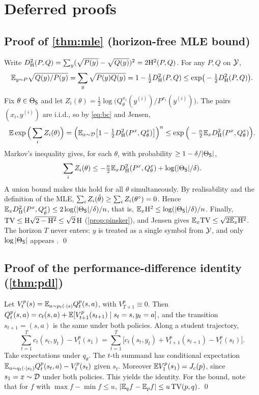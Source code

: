 \section{Deferred proofs}\label{app:proofs}

\subsection{Proof of \cref{thm:mle} (horizon-free MLE bound)}\label{app:mle}

Write $D_{\mathrm{H}}^2(P,Q)=\sum_y(\sqrt{P(y)}-\sqrt{Q(y)})^2=2\mathrm{H}^2(P,Q)$. For any $P,Q$ on $\mathcal{Y}$,
\begin{equation}\label{eq:bc}
\mathbb{E}_{y\sim P}\sqrt{Q(y)/P(y)}=\sum_y\sqrt{P(y)Q(y)}=1-\tfrac12D_{\mathrm{H}}^2(P,Q)\le\exp\!\big(-\tfrac12D_{\mathrm{H}}^2(P,Q)\big).
\end{equation}
Fix $\theta\in\Theta_{\mathsf{S}}$ and let $Z_i(\theta)=\frac12\log\big(Q^{x_i}_\theta(y^{(i)})/P^{x_i}(y^{(i)})\big)$. The pairs
$(x_i,y^{(i)})$ are i.i.d., so by \eqref{eq:bc} and Jensen,
\[
\mathbb{E}\exp\Big(\sum_iZ_i(\theta)\Big)=\Big(\mathbb{E}_{x\sim\mathcal{D}}\big[1-\tfrac12D_{\mathrm{H}}^2(P^{x},Q^{x}_{\theta})\big]\Big)^n\le\exp\Big(-\tfrac n2\mathbb{E}_xD_{\mathrm{H}}^2(P^{x},Q^{x}_{\theta})\Big).
\]
Markov's inequality gives, for each $\theta$, with probability $\ge1-\delta/|\Theta_{\mathsf{S}}|$,
\[
\sum_iZ_i(\theta)\le-\tfrac n2\mathbb{E}_xD_{\mathrm{H}}^2(P^{x},Q^{x}_{\theta})+\log(|\Theta_{\mathsf{S}}|/\delta).
\]
A union bound makes this hold for all $\theta$ simultaneously. By realisability and the definition of
the MLE, $\sum_iZ_i(\hat\theta)\ge\sum_iZ_i(\theta^\circ)=0$. Hence
$\mathbb{E}_xD_{\mathrm{H}}^2(P^{x},Q^x_{\hat\theta})\le2\log(|\Theta_{\mathsf{S}}|/\delta)/n$, that is,
$\mathbb{E}_x\mathrm{H}^2\le\log(|\Theta_{\mathsf{S}}|/\delta)/n$. Finally,
$\mathrm{TV}\le\mathrm{H}\sqrt{2-\mathrm{H}^2}\le\sqrt2\,\mathrm{H}$ (\cref{prop:pinsker}), and Jensen gives
$\mathbb{E}_x\mathrm{TV}\le\sqrt{2\mathbb{E}_x\mathrm{H}^2}$. The horizon $T$ never enters: $y$ is treated as a single symbol from $\mathcal{Y}$,
and only $\log|\Theta_{\mathsf{S}}|$ appears \citep{zhang2006epsilon,foster2024behavior}. \qed

\subsection{Proof of the performance-difference identity (\cref{thm:pdl})}

Let $V^p_t(s)=\mathbb{E}_{a\sim p_t(\cdot\mid s)}Q^p_t(s,a)$, with $V^p_{T+1}\equiv0$. Then
$Q^p_t(s,a)=c_t(s,a)+\mathbb{E}[V^p_{t+1}(s_{t+1})\mid s_t=s,y_t=a]$, and the transition $s_{t+1}=(s,a)$ is the same
under both policies. Along a student trajectory,
\[
\sum_{t=1}^Tc_t(s_t,y_t)-V^p_1(s_1)=\sum_{t=1}^T\big[c_t(s_t,y_t)+V^p_{t+1}(s_{t+1})-V^p_t(s_t)\big].
\]
Take expectations under $q_\theta$. The $t$-th summand has conditional expectation
$\mathbb{E}_{a\sim q_t(\cdot\mid s_t)}Q^p_t(s_t,a)-V^p_t(s_t)$ given $s_t$. Moreover $\mathbb{E} V^p_1(s_1)=J_c(p)$, since
$s_1=x\sim\mathcal{D}$ under both policies. This yields the identity. For the bound, note that for $f$ with
$\max f-\min f\le u$, $|\mathbb{E}_qf-\mathbb{E}_pf|\le u\,\mathrm{TV}(p,q)$. \qed

